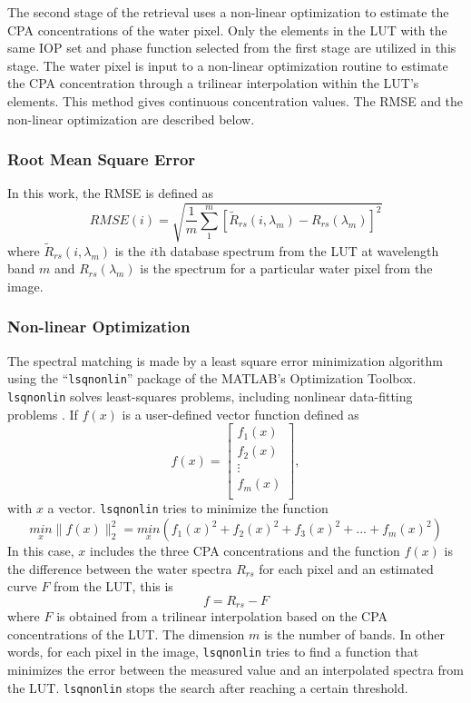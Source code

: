 \documentclass[onecolumn,3p,letterpaper]{elsarticle}
\begin{document}
The second stage of the retrieval uses a non-linear optimization to estimate the CPA concentrations of the water pixel. Only the elements in the LUT with the same IOP set and phase function selected from the first stage are utilized in this stage. The water pixel is input to a non-linear optimization routine to estimate the CPA concentration through a trilinear interpolation within the LUT's elements. This method gives continuous concentration values. The RMSE and the non-linear optimization are described below.
\subsubsection{Root Mean Square Error}
In this work, the RMSE is defined as
\begin{equation}
  RMSE(i) = \sqrt{\frac{1}{m}\sum_1^m\left[\widetilde{R}_{rs}(i,\lambda_m)-R_{rs}(\lambda_m)\right]^2}
\end{equation}
where $\widetilde{R}_{rs}(i,\lambda_m)$ is the $i$th database spectrum from the LUT at wavelength band $m$ and $R_{rs}(\lambda_m)$ is the spectrum for a particular water pixel from the image.

\subsubsection{Non-linear Optimization}
The spectral matching is made by a least square error minimization algorithm using the ``\texttt{lsqnonlin}'' package of the MATLAB's Optimization Toolbox. \texttt{lsqnonlin} solves least-squares problems, including nonlinear data-fitting problems \citep{MatlabHelp}. If $f(x)$ is a user-defined vector function defined as
\begin{equation}
  f(x)=
  \left[
    \begin{array}{c}
      f_1(x) \\
      f_2(x) \\
      \vdots \\
      f_m(x) \\
    \end{array}
  \right],
\end{equation}
with $x$ a vector. \texttt{lsqnonlin} tries to minimize the function
\begin{equation}
  \underset{x}{min}\parallel f(x) \parallel^2_2=\underset{x}{min}(f_1(x)^2+f_2(x)^2+f_3(x)^2+...+f_m(x)^2)
\end{equation}
In this case, $x$ includes the three CPA concentrations and the function $f(x)$ is the difference between the water spectra $R_{rs}$ for each pixel and an estimated curve $F$ from the LUT, this is
\begin{equation}
  f = R_{rs} - F
\end{equation}
where $F$ is obtained from a trilinear interpolation based on the CPA concentrations of the LUT. The dimension $m$ is the number of bands. In other words, for each pixel in the image, \texttt{lsqnonlin} tries to find a function that minimizes the error between the measured value and an interpolated spectra from the LUT. \texttt{lsqnonlin} stops the search after reaching a certain threshold. 
\end{document}
